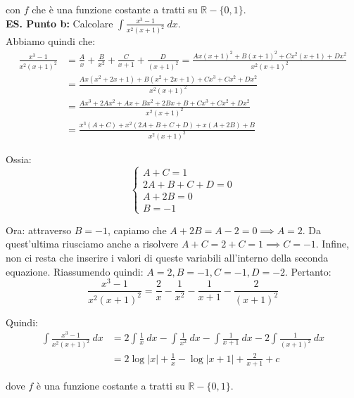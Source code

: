 \documentclass{article}
\begin{document}
\noindent con $f$ che è una funzione costante a tratti su $\mathbb{R} - \{0, 1\}$.\\

\noindent\textbf{ES. Punto b:} Calcolare $\int \frac{x^3 - 1}{x^2(x + 1)^2} \ dx$.\\
Abbiamo quindi che:
\begin{align*}
    \frac{x^3 - 1}{x^2(x + 1)^2} &= \frac{A}{x} + \frac{B}{x^2} + \frac{C}{x + 1} + \frac{D}{(x + 1)^2} = \frac{Ax(x+1)^2 + B(x + 1)^2 + Cx^2(x + 1) + Dx^2}{x^2(x + 1)^2} \\
    &= \frac{Ax(x^2 + 2x + 1) + B(x^2 + 2x + 1) + Cx^3 + Cx^2 + Dx^2}{x^2(x + 1)^2} \\
    &= \frac{Ax^3 + 2Ax^2 + Ax + Bx^2 + 2Bx + B + Cx^3 + Cx^2 + Dx^2}{x^2(x + 1)^2} \\
    &= \frac{x^3(A + C) + x^2(2A + B + C + D) + x(A + 2B) + B}{x^2(x + 1)^2}
\end{align*}

\noindent Ossia:
\begin{equation*}
    \begin{cases}
        A + C = 1 \\
        2A + B + C + D = 0 \\
        A + 2B = 0 \\
        B = -1
    \end{cases}
\end{equation*}

\noindent Ora: attraverso $B = -1$, capiamo che $A + 2B = A - 2 = 0 \implies A = 2$. Da quest'ultima riusciamo anche a risolvere $A + C = 2 + C = 1 \implies C = -1$. Infine, non ci resta che inserire i valori di queste variabili all'interno della seconda equazione. Riassumendo quindi: $A = 2, B = -1, C = -1, D = -2$. Pertanto:
\begin{equation*}
    \frac{x^3 - 1}{x^2(x + 1)^2} = \frac{2}{x} - \frac{1}{x^2} - \frac{1}{x + 1} - \frac{2}{(x + 1)^2}
\end{equation*}

\noindent Quindi:
\begin{align*}
    \int \frac{x^3 - 1}{x^2(x + 1)^2} \ dx &= 2\int \frac{1}{x} \ dx - \int \frac{1}{x^2} \ dx - \int \frac{1}{x + 1} \ dx -2 \int \frac{1}{(x + 1)^2} \ dx \\
    &= 2\log|x| + \frac{1}{x} - \log|x + 1| + \frac{2}{x + 1} + c
\end{align*}

\noindent dove $f$ è una funzione costante a tratti su $\mathbb{R} - \{0, 1\}$.\\
\end{document}
